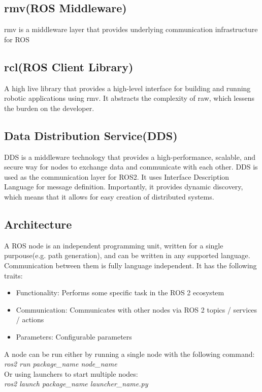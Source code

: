 \subsection{rmv(ROS Middleware)}
rmv is a middleware layer that provides underlying communication infrastructure for ROS
\subsection{rcl(ROS Client Library)}
A high live library that provides a high-level interface for building and running robotic applications using rmv. It abstracts the complexity of raw, which lessens the burden on the developer.

\subsection{Data Distribution Service(DDS)}
DDS is a middleware technology that provides a high-performance, scalable, and secure way for nodes to exchange data and communicate with each other. DDS is used as the communication layer for ROS2. It uses Interface Description Language for message definition. Importantly, it provides dynamic discovery, which means that it allows for easy creation of distributed systems.


\subsection{Architecture}
{
    A ROS node is an independent programming unit, written for a single purpouse(e.g. path generation), and can be written in any supported language. Communication between them is fully language independent.
    It has the following traits:
    \begin{itemize}
        \item Functionality: Performs some specific task in the ROS 2 ecosystem
        \item Communication: Communicates with other nodes via ROS 2 topics / services / actions
        \item Parameters: Configurable parameters

    \end{itemize}
}
{
    A node can be run either by running a single node with the following command:\\
    \textit{ros2 run package_name node_name}\\
    Or using launchers to start multiple nodes:\\
    \textit{ros2 launch package_name launcher_name.py}
}
